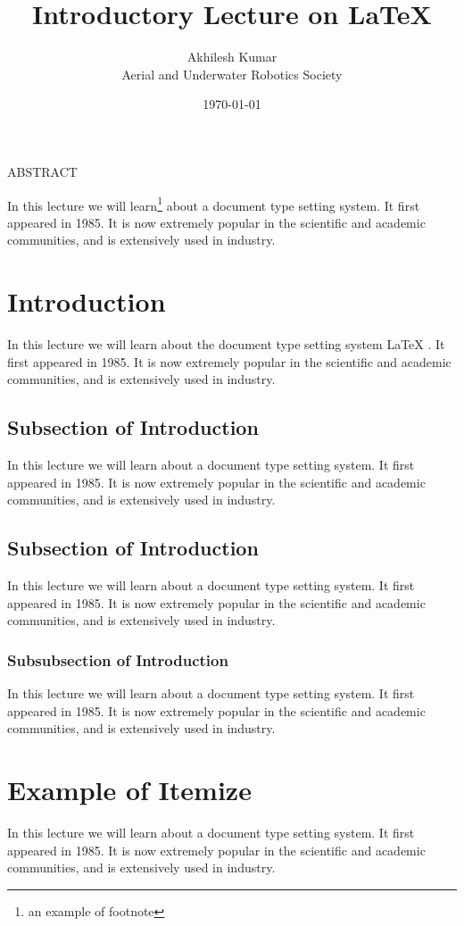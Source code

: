 \documentclass{article}
\title{Introductory Lecture on \LaTeX}
\author{Akhilesh Kumar\\Aerial and Underwater Robotics Society}
\date{\today}
\begin{document}
\maketitle

\tableofcontents

\newpage

\begin{center}{ABSTRACT}
\end{center}

In this lecture we will learn\footnote{an example of footnote}
 about a document type setting system. It first
appeared in 1985. It is now extremely popular in the scientific and academic
communities, and is extensively used in industry.

\section{Introduction}
In this lecture we will learn about the document type setting system \LaTeX
\cite{mainref, suppref}. It first
appeared in 1985. It is now extremely popular in the scientific and academic
communities, and is extensively used in industry.

\subsection{Subsection of Introduction}
In this lecture we will learn about a document type setting system. It first
appeared in 1985. It is now extremely popular in the scientific and academic
communities, and is extensively used in industry.

\subsection{Subsection of Introduction}
In this lecture we will learn about a document type setting system. It first
appeared in 1985. It is now extremely popular in the scientific and academic
communities, and is extensively used in industry.

\subsubsection{Subsubsection of Introduction}
In this lecture we will learn about a document type setting system. It first
appeared in 1985. It is now extremely popular in the scientific and academic
communities, and is extensively used in industry.


\section{Example of Itemize}
In this lecture we will learn about a document type setting system. It first
appeared in 1985. It is now extremely popular in the scientific and academic
communities, and is extensively used in industry.
\end{document}
